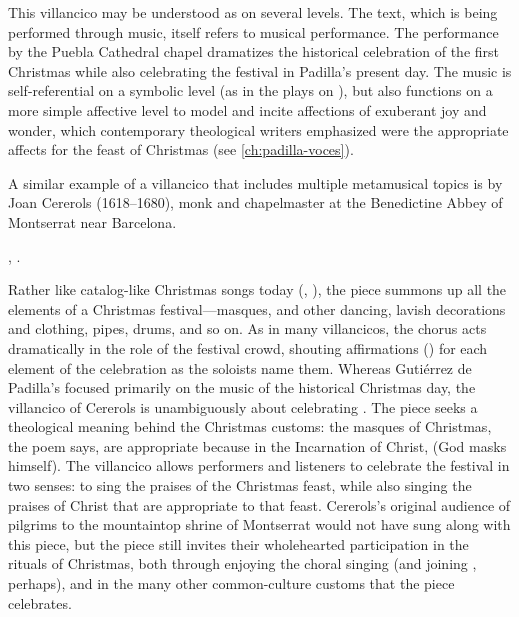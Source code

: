 
This villancico may be understood as  on several
levels.  
The text, which is being performed through music, itself refers to musical
performance.
The performance by the Puebla Cathedral chapel dramatizes the historical
celebration of the first Christmas while also celebrating the festival in
Padilla's present day.  
The music is self-referential on a symbolic level (as in the plays on
), but also functions on a more simple affective level to model and
incite affections of exuberant joy and wonder, which contemporary theological
writers emphasized were the appropriate affects for the feast of Christmas (see
\cref{ch:padilla-voces}).

A similar example of a villancico that includes multiple metamusical topics is  by Joan Cererols (1618--1680), monk and chapelmaster at the Benedictine Abbey of Montserrat near Barcelona.%
\begin{Footnote}
    , \autocite[81--94]{Cererols:MEM-VC}.
\end{Footnote}
Rather like catalog-like Christmas songs today (,
), the piece summons up all the
elements of a Christmas festival---masques,  and other
dancing, lavish decorations and clothing, pipes, drums, and so on.
As in many villancicos, the chorus acts dramatically in the role of the
festival crowd, shouting affirmations () for each element of
the celebration as the soloists name them.  
Whereas Gutiérrez de Padilla's  focused
primarily on the music of the historical Christmas day, the villancico of
Cererols is unambiguously about celebrating .
The piece seeks a theological meaning behind the Christmas customs: the masques
of Christmas, the poem says, are appropriate because in the Incarnation of
Christ,  (God masks himself).
The villancico allows performers and listeners to celebrate the festival in two
senses: to sing the praises of the Christmas feast, while also singing the
praises of Christ that are appropriate to that feast. 
Cererols's original audience of pilgrims to the mountaintop shrine of
Montserrat would not have sung along with this piece, but the piece still
invites their wholehearted participation in the rituals of Christmas, both
through enjoying the choral singing (and joining , perhaps),
and in the many other common-culture customs that the piece celebrates.

